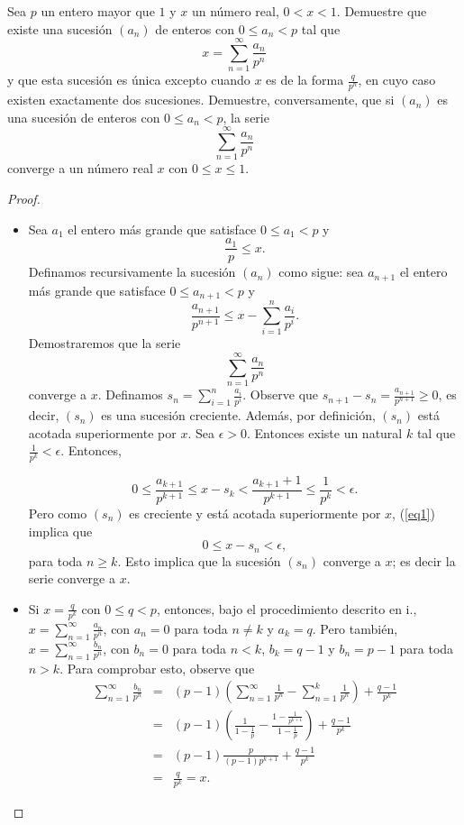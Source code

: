 \documentclass[12pt]{article}
\newenvironment{problem}[2][Problema]{\begin{trivlist}
\item[\hskip \labelsep {\bfseries #1}\hskip \labelsep {\bfseries #2.}]}{\end{trivlist}}
\begin{document}
\begin{problem}{21}
Sea $p$ un entero mayor que $1$ y $x$ un número real, $0 < x < 1.$ Demuestre que existe una sucesión $(a_n)$ de enteros con $0 \leq a_n < p$ tal que 
$$x = \sum_{n=1}^{\infty}\frac{a_n}{p^n} $$
y que esta sucesión es única excepto cuando $x$ es de la forma $\frac{q}{p^n}$, en cuyo caso existen exactamente dos sucesiones. Demuestre, conversamente, que si  $(a_n)$ es una sucesión de enteros con $0 \leq a_n < p$, la serie
$$\sum_{n=1}^{\infty}\frac{a_n}{p^n} $$
converge a un número real $x$ con $0\leq x \leq 1$.

\end{problem}
\begin{proof}
\text{ }
\begin{itemize}
    \item[i.] Sea $a_1$ el entero más grande que satisface $ 0\leq a_1 < p$ y $$\frac{a_1}{p} \leq x.$$
Definamos recursivamente la sucesión $(a_n)$ como sigue: sea $a_{n+1}$ el entero más grande que satisface $0 \leq a_{n+1} < p$ y $$\frac{a_{n+1}}{p^{n+1}} \leq  x - \sum_{i=1}^n \frac{a_i}{p^i}.$$ Demostraremos que la serie 
$$\sum_{n=1}^{\infty}\frac{a_n}{p^n} $$
converge a $x$. Definamos $s_n =  \sum_{i=1}^n \frac{a_i}{p^i}.$ Observe que $s_{n+1} - s_n = \frac{a_{n+1}}{p^{n+1}} \geq  0$, es decir, $(s_n)$ es una sucesión creciente. Además, por definición, $(s_n)$ está acotada superiormente por $x$.
Sea $\epsilon > 0$. Entonces existe un natural $k$ tal que $\frac{1}{p^k} < \epsilon$. Entonces,

\begin{equation}\label{eq1}
0 \leq \frac{a_{k+1}}{p^{k+1}} \leq x - s_k <  \frac{a_{k+1} + 1}{p^{k+1}} \leq \frac{1}{p^{k}} < \epsilon.
\end{equation} 
Pero como $(s_n)$ es creciente y está acotada superiormente por $x$, (\ref{eq1}) implica que 
$$ 0 \leq x - s_n < \epsilon, $$
para toda $n \geq  k$. Esto implica que la sucesión $(s_n)$ converge a $x$; es decir la serie converge a $x$. 

\item[ii.] Si $x = \frac{q}{p^k}$ con $0\leq q < p$, entonces, bajo el procedimiento descrito en i., $x = \sum_{n=1}^\infty \frac{a_n}{p^n}$, con $a_n = 0$ para toda $n \neq k$ y $a_k = q$. Pero también, $x = \sum_{n=1}^{\infty} \frac{b_n}{p^n}$, con $b_n = 0$ para toda $n<k$, $b_k = q - 1$ y $b_n = p-1$ para toda $n > k$. Para comprobar esto, observe que
\begin{eqnarray*}
 \sum_{n=1}^{\infty} \frac{b_n}{p^n} &=& (p-1) \left( \sum_{n=1}^{\infty} \frac{1}{p^n} - \sum_{n=1}^{k} \frac{1}{p^n} \right) + \frac{q-1}{p^k}\\
 &=& (p-1) \left( \frac{1}{1 - \frac{1}{p}} - \frac{1 - \frac{1}{p^{k+1}}}{1 - \frac{1}{p}} \right) + \frac{q-1}{p^k}\\
 &=& (p-1) \frac{p}{(p-1)p^{k+1}} + \frac{q-1}{p^k}\\
 &=& \frac{q}{p^k}  = x.
\end{eqnarray*}



\end{itemize}
\end{proof}
\end{document}
